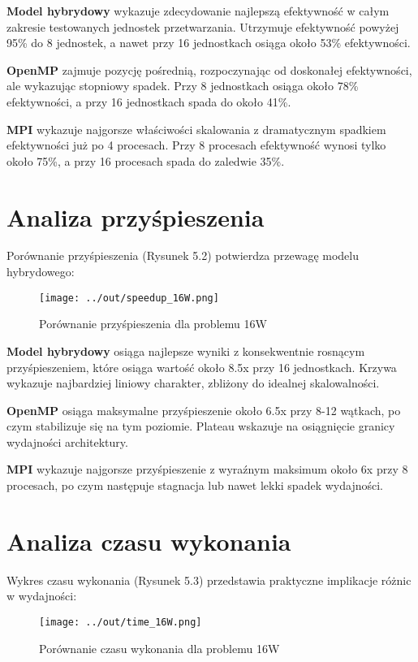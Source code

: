 \documentclass[12pt,a4paper]{report}
\begin{document}
\textbf{Model hybrydowy} wykazuje zdecydowanie najlepszą efektywność w całym zakresie testowanych jednostek przetwarzania. Utrzymuje efektywność powyżej 95\% do 8 jednostek, a nawet przy 16 jednostkach osiąga około 53\% efektywności.

\textbf{OpenMP} zajmuje pozycję pośrednią, rozpoczynając od doskonałej efektywności, ale wykazując stopniowy spadek. Przy 8 jednostkach osiąga około 78\% efektywności, a przy 16 jednostkach spada do około 41\%.

\textbf{MPI} wykazuje najgorsze właściwości skalowania z dramatycznym spadkiem efektywności już po 4 procesach. Przy 8 procesach efektywność wynosi tylko około 75\%, a przy 16 procesach spada do zaledwie 35\%.

\section{Analiza przyśpieszenia}

Porównanie przyśpieszenia (Rysunek 5.2) potwierdza przewagę modelu hybrydowego:

\begin{figure}[h]
    \centering
    \texttt{[image: ../out/speedup\_16W.png]}
    \caption{Porównanie przyśpieszenia dla problemu 16W}
    \label{fig:comparison_speedup}
\end{figure}

\textbf{Model hybrydowy} osiąga najlepsze wyniki z konsekwentnie rosnącym przyśpieszeniem, które osiąga wartość około 8.5x przy 16 jednostkach. Krzywa wykazuje najbardziej liniowy charakter, zbliżony do idealnej skalowalności.

\textbf{OpenMP} osiąga maksymalne przyśpieszenie około 6.5x przy 8-12 wątkach, po czym stabilizuje się na tym poziomie. Plateau wskazuje na osiągnięcie granicy wydajności architektury.

\textbf{MPI} wykazuje najgorsze przyśpieszenie z wyraźnym maksimum około 6x przy 8 procesach, po czym następuje stagnacja lub nawet lekki spadek wydajności.

\section{Analiza czasu wykonania}

Wykres czasu wykonania (Rysunek 5.3) przedstawia praktyczne implikacje różnic w wydajności:

\begin{figure}[h]
    \centering
    \texttt{[image: ../out/time\_16W.png]}
    \caption{Porównanie czasu wykonania dla problemu 16W}
    \label{fig:comparison_time}
\end{figure}
\end{document}

